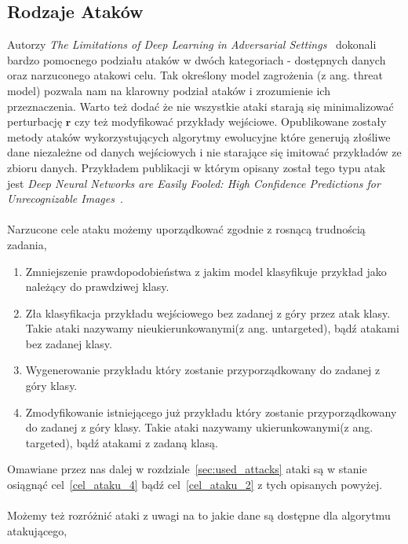 \documentclass[
    left=2.5cm,         %
    right=2.5cm,        %
    top=2.5cm,          %
    bottom=3cm,         %
    bindingoffset=6mm,  %
    nohyphenation=false %
]{eiti/eiti-thesis}
\renewcommand{\vec}[1]{\mathbf{#1}}
\begin{document}
\newpage

\subsection{Rodzaje Ataków}\label{attack-kinds}
Autorzy \textit{The Limitations of Deep Learning in Adversarial Settings}~\cite{DBLP:journals/corr/PapernotMJFCS15}
dokonali bardzo pomocnego podziału ataków w dwóch kategoriach - dostępnych danych oraz narzuconego atakowi celu. Tak określony
model zagrożenia (z ang. threat model) pozwala nam na klarowny podział ataków i zrozumienie ich przeznaczenia. Warto też dodać
że nie wszystkie ataki starają się minimalizować perturbację $\vec{r}$ czy też modyfikować przykłady wejściowe. Opublikowane zostały
metody ataków wykorzystujących algorytmy ewolucyjne które generują złośliwe dane niezależne od danych wejściowych i nie starające się
imitować przykładów ze zbioru danych. Przykładem publikacji w którym opisany został tego typu atak jest \textit{Deep Neural Networks are Easily Fooled: High Confidence Predictions for Unrecognizable Images}~\cite{DBLP:journals/corr/NguyenYC14}.
\\~\\
Narzucone cele ataku możemy uporządkować zgodnie z rosnącą trudnością zadania,
\begin{enumerate}
    \item Zmniejszenie prawdopodobieństwa z jakim model klasyfikuje przykład jako należący do prawdziwej klasy.
    \item \label{cel_ataku_2} Zła klasyfikacja przykładu wejściowego bez zadanej z góry przez atak klasy. Takie ataki nazywamy nieukierunkowanymi(z ang. untargeted), bądź atakami bez zadanej klasy.
    \item Wygenerowanie przykładu który zostanie przyporządkowany do zadanej z góry klasy.
    \item \label{cel_ataku_4} Zmodyfikowanie istniejącego już przykładu który zostanie przyporządkowany do zadanej z góry klasy. Takie ataki nazywamy ukierunkowanymi(z ang. targeted), bądź atakami z zadaną klasą.
\end{enumerate}
Omawiane przez nas dalej w rozdziale~\ref{sec:used_attacks} ataki są w stanie osiągnąć cel~\ref{cel_ataku_4} bądź cel~\ref{cel_ataku_2} z tych opisanych powyżej.
\\~\\
Możemy też rozróżnić ataki z uwagi na to jakie dane są dostępne dla algorytmu atakującego,
\end{document}
